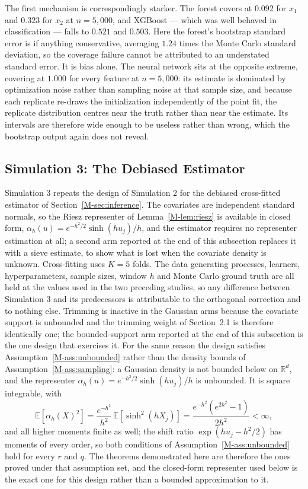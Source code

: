 \documentclass[12pt,a4paper]{article}
\numberwithin{equation}{section}
\theoremstyle{plain}
\theoremstyle{definition}
\newcommand{\R}{\mathbb{R}}
\newcommand{\E}{\mathbb{E}}
\begin{document}
	The first mechanism is correspondingly starker. The forest covers at $0.092$ for $x_1$ and $0.323$ for $x_2$ at $n=5{,}000$, and XGBoost --- which was well behaved in classification --- falls to $0.521$ and $0.503$. Here the forest's bootstrap standard error is if anything conservative, averaging $1.24$ times the Monte Carlo standard deviation, so the coverage failure cannot be attributed to an understated standard error. It is bias alone. The neural network sits at the opposite extreme, covering at $1.000$ for every feature at $n=5{,}000$: its estimate is dominated by optimization noise rather than sampling noise at that sample size, and because each replicate re-draws the initialization independently of the point fit, the replicate distribution centres near the truth rather than near the estimate. Its intervals are therefore wide enough to be useless rather than wrong, which the bootstrap output again does not reveal.
	
	\subsection{Simulation 3: The Debiased Estimator}
	
	Simulation 3 repeats the design of Simulation 2 for the debiased cross-fitted estimator of Section~\ref{M-sec:inference}. The covariates are independent standard normals, so the Riesz representer of Lemma~\ref{M-lem:riesz} is available in closed form, $\alpha_h(u) = e^{-h^2/2}\sinh(h u_j)/h$, and the estimator requires no representer estimation at all; a second arm reported at the end of this subsection replaces it with a sieve estimate, to show what is lost when the covariate density is unknown. Cross-fitting uses $K=5$ folds. The data generating processes, learners, hyperparameters, sample sizes, window $h$ and Monte Carlo ground truth are all held at the values used in the two preceding studies, so any difference between Simulation 3 and its predecessors is attributable to the orthogonal correction and to nothing else. Trimming is inactive in the Gaussian arms because the covariate support is unbounded and the trimming weight of Section~2.1 is therefore identically one; the bounded-support arm reported at the end of this subsection is the one design that exercises it. For the same reason the design satisfies Assumption~\ref{M-ass:unbounded} rather than the density bounds of Assumption~\ref{M-ass:sampling}: a Gaussian density is not bounded below on $\R^d$, and the representer $\alpha_h(u) = e^{-h^2/2}\sinh(h u_j)/h$ is unbounded. It is square integrable, with
	\begin{equation}
		\E\left[\alpha_h(X)^2\right]
		= \frac{e^{-h^2}}{h^2}\,\E\left[\sinh^2(h X_j)\right]
		= \frac{e^{-h^2}\left(e^{2h^2} - 1\right)}{2h^2} < \infty ,
		\label{eq:gaussalpha}
	\end{equation}
	and all higher moments finite as well; the shift ratio $\exp(h u_j - h^2/2)$ has moments of every order, so both conditions of Assumption~\ref{M-ass:unbounded} hold for every $r$ and $q$. The theorems demonstrated here are therefore the ones proved under that assumption set, and the closed-form representer used below is the exact one for this design rather than a bounded approximation to it.
	
\end{document}
